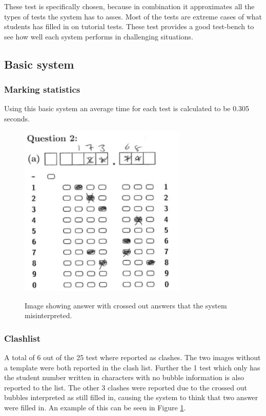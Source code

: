 These test is specifically chosen, because in combination it approximates all the types of tests the system has to asses. Most of the tests are extreme cases of what students has filled in on tutorial tests. These test provides a good test-bench to see how well each system performs in challenging situations.

\subsection{Basic system}
\subsubsection{Marking statistics}

Using this basic system an average time for each test is calculated to be 0.305 seconds. 

\begin{figure}
  \centering
  \includegraphics[width=8cm]{crossClash}\\
  \caption{Image showing answer with crossed out answers that the system misinterpreted.}
  \label{fig:crossClash}
\end{figure}

\subsubsection{Clashlist}

A total of 6 out of the 25 test where reported as clashes. The two images without a template were both reported in the clash list. Further the 1 test which only has the student number written in characters with no bubble information is also reported to the list. The other 3 clashes were reported due to the crossed out bubbles interpreted as still filled in, causing the system to think that two answer were filled in. An example of this can be seen in Figure \ref{fig:crossClash}.

